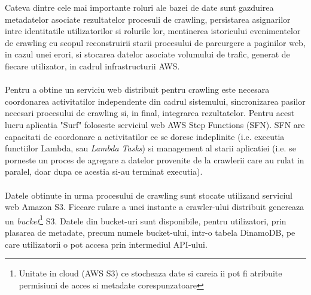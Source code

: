 \noindent
Cateva dintre cele mai importante roluri ale bazei de date sunt gazduirea metadatelor asociate rezultatelor procesuli de crawling, persistarea asignarilor intre identitatile utilizatorilor si rolurile lor, mentinerea istoricului evenimentelor de crawling cu scopul reconstruirii starii procesului de parcurgere a paginilor web, in cazul unei erori, si stocarea datelor asociate volumului de trafic, generat de fiecare utilizator, in cadrul infrastructurii AWS.
\\
\\
Pentru a obtine un serviciu web distribuit pentru crawling este necesara coordonarea activitatilor independente din cadrul sistemului, sincronizarea pasilor necesari procesului de crawling si, in final, integrarea rezultatelor. Pentru acest lucru aplicatia "Surf" foloseste serviciul web AWS Step Functions (SFN). SFN  are capacitati de coordonare a activitatilor ce se doresc indeplinite (i.e. executia functiilor Lambda, sau \emph{Lambda Tasks}) si management al starii aplicatiei (i.e. se porneste un proces de agregare a datelor provenite de la crawlerii care au rulat in paralel, doar dupa ce acestia si-au terminat executia).
\\
\\
Datele obtinute in urma procesului de crawling sunt stocate utilizand serviciul web Amazon S3. Fiecare rulare a unei instante a crawler-ului distribuit genereaza un \emph{bucket}\footnote{Unitate in cloud (AWS S3) ce stocheaza date si careia ii pot fi atribuite permisiuni de acces si metadate corespunzatoare} S3. Datele din bucket-uri sunt disponibile, pentru utilizatori, prin plasarea de metadate, precum numele bucket-ului, intr-o tabela DinamoDB, pe care utilizatorii o pot accesa prin intermediul API-ului.

